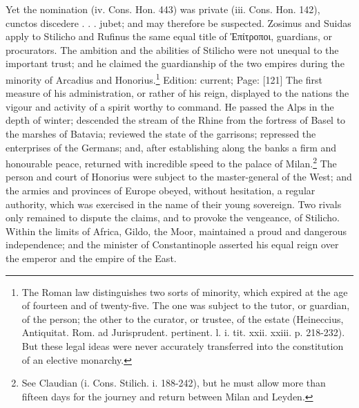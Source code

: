 {Yet the nomination (iv. Cons. Hon. 443) was private (iii. Cons. Hon. 142), cunctos discedere . . . jubet; and may therefore be suspected. Zosimus and Suidas apply to Stilicho and Rufinus the same equal title of \textgreek{\texthebrew{Ἐ}πίτροποι}, guardians, or procurators.} The ambition and the abilities of Stilicho were not unequal to the important trust; and he claimed the guardianship of the two empires during the minority of Arcadius and Honorius.\footnote{The Roman law distinguishes two sorts of minority, which expired at the age of fourteen and of twenty-five. The one was subject to the tutor, or guardian, of the person; the other to the curator, or trustee, of the estate (Heineccius, Antiquitat. Rom. ad Jurisprudent. pertinent. l. i. tit. xxii. xxiii. p. 218-232). But these legal ideas were never accurately transferred into the constitution of an elective monarchy.} Edition: current; Page: [121] The first measure of his administration, or rather of his reign, displayed to the nations the vigour and activity of a spirit worthy to command. He passed the Alps in the depth of winter; descended the stream of the Rhine from the fortress of Basel to the marshes of Batavia; reviewed the state of the garrisons; repressed the enterprises of the Germans; and, after establishing along the banks a firm and honourable peace, returned with incredible speed to the palace of Milan.\footnote{See Claudian (i. Cons. Stilich. i. 188-242), but he must allow more than fifteen days for the journey and return between Milan and Leyden.} The person and court of Honorius were subject to the master-general of the West; and the armies and provinces of Europe obeyed, without hesitation, a regular authority, which was exercised in the name of their young sovereign. Two rivals only remained to dispute the claims, and to provoke the vengeance, of Stilicho. Within the limits of Africa, Gildo, the Moor, maintained a proud and dangerous independence; and the minister of Constantinople asserted his equal reign over the emperor and the empire of the East.

